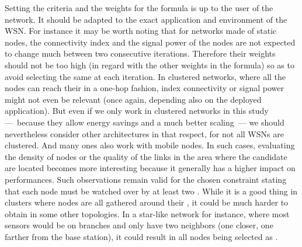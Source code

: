 Setting the criteria and the weights for the formula is up to the user of the network.
It should be adapted to the exact application and environment of the WSN.
For instance it may be worth noting that for networks made of static nodes, the connectivity index and the signal power of the nodes are not expected to change much between two consecutive iterations.
Therefore their weights should not be too high (in regard with the other weights in the formula) so as to avoid selecting the same \cns at each iteration.
In clustered networks, where all the nodes can reach their \CH in a one-hop fashion, index connectivity or signal power might not even be relevant (once again, depending also on the deployed application).
But even if we only work in clustered networks in this study ---~because they allow energy savings and a much better scaling~--- we should nevertheless consider other architectures in that respect, for not all WSNs are clustered.
And many ones also work with mobile nodes.
In such cases, evaluating the density of nodes or the quality of the links in the area where the candidate \cns are located becomes more interesting because it generally has a higher impact on performances.
Such observations remain valid for the chosen constraint stating that each node must be watched over by at least two \cns.
While it is a good thing in clusters where nodes are all gathered around their \ch, it could be much harder to obtain in some other topologies.
In a star-like network for instance, where most sensors would be on branches and only have two neighbors (one closer, one farther from the base station), it could result in all nodes being selected as \cns.
